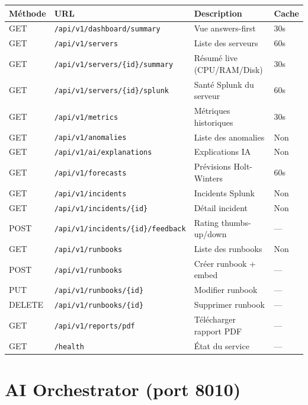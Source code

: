 \begin{longtable}{llp{4.5cm}p{3.5cm}}
\toprule
\textbf{Méthode} & \textbf{URL} & \textbf{Description} & \textbf{Cache} \\
\midrule
\endhead
\bottomrule
\endfoot
GET & \texttt{/api/v1/dashboard/summary}       & Vue answers-first      & 30s \\
GET & \texttt{/api/v1/servers}                 & Liste des serveurs     & 60s \\
GET & \texttt{/api/v1/servers/\{id\}/summary}  & Résumé live (CPU/RAM/Disk) & 30s \\
GET & \texttt{/api/v1/servers/\{id\}/splunk}   & Santé Splunk du serveur & 60s \\
GET & \texttt{/api/v1/metrics}                 & Métriques historiques  & 30s \\
GET & \texttt{/api/v1/anomalies}               & Liste des anomalies    & Non \\
GET & \texttt{/api/v1/ai/explanations}         & Explications IA        & Non \\
GET & \texttt{/api/v1/forecasts}               & Prévisions Holt-Winters & 60s \\
GET & \texttt{/api/v1/incidents}               & Incidents Splunk       & Non \\
GET & \texttt{/api/v1/incidents/\{id\}}        & Détail incident        & Non \\
POST & \texttt{/api/v1/incidents/\{id\}/feedback} & Rating thumbs-up/down & — \\
GET & \texttt{/api/v1/runbooks}                & Liste des runbooks     & Non \\
POST & \texttt{/api/v1/runbooks}               & Créer runbook + embed  & — \\
PUT & \texttt{/api/v1/runbooks/\{id\}}         & Modifier runbook       & — \\
DELETE & \texttt{/api/v1/runbooks/\{id\}}      & Supprimer runbook      & — \\
GET & \texttt{/api/v1/reports/pdf}             & Télécharger rapport PDF & — \\
GET & \texttt{/health}                         & État du service        & — \\
\end{longtable}

\section{AI Orchestrator (port 8010)}


